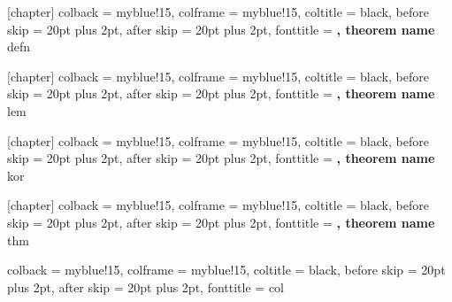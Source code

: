 
[chapter]
{\thedefn}
{
colback		= myblue!15,
colframe	= myblue!15,
coltitle	= black,
before skip	= 20pt plus 2pt,
after skip	= 20pt plus 2pt,
fonttitle	= \bfseries,
theorem name
}
{defn}
\def\thedefn{Definition \thechapter.\arabic{defn}}

[chapter]
{\thelem}
{
colback		= myblue!15,
colframe	= myblue!15,
coltitle	= black,
before skip	= 20pt plus 2pt,
after skip	= 20pt plus 2pt,
fonttitle	= \bfseries,
theorem name
}
{lem}
\def\thelem{Lemma \thechapter.\arabic{lem}}

[chapter]
{\thekor}
{
colback		= myblue!15,
colframe	= myblue!15,
coltitle	= black,
before skip	= 20pt plus 2pt,
after skip	= 20pt plus 2pt,
fonttitle	= \bfseries,
theorem name
}
{kor}
\def\thekor{Korollar \thechapter.\arabic{kor}}

[chapter]
{\thethm}
{
colback		= myblue!15,
colframe	= myblue!15,
coltitle	= black,
before skip	= 20pt plus 2pt,
after skip	= 20pt plus 2pt,
fonttitle	= \bfseries,
theorem name
}
{thm}
\def\thethm{Sætning \thechapter.\arabic{thm}}

{}
{
colback		= myblue!15,
colframe	= myblue!15,
coltitle	= black,
before skip	= 20pt plus 2pt,
after skip	= 20pt plus 2pt,
fonttitle	= \bfseries
}
{col}


\newcommand{\imgfig}[3][0.75]{
  \begin{figure}[htbp]
    \centering
    \texttt{[image: fig/img/\#2]}
    \caption{#3}
    \label{fig:#2}
  \end{figure}
}

